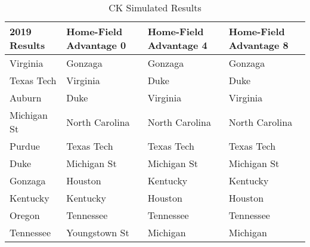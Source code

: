 \begin {table}\caption{CK Simulated Results}\begin{tabular}{ |p{2cm}|p{2cm}|p{2cm}|p{2cm}|  }
\hline
 2019 Results &  Home-Field Advantage 0 & Home-Field Advantage 4& Home-Field Advantage 8\\
\hline
Virginia & Gonzaga & Gonzaga & Gonzaga\\
\hline
Texas Tech & Virginia & Duke & Duke\\
\hline
Auburn & Duke & Virginia & Virginia\\
\hline
Michigan St & North Carolina & North Carolina & North Carolina\\
\hline
Purdue & Texas Tech & Texas Tech & Texas Tech\\
\hline
Duke & Michigan St & Michigan St & Michigan St\\
\hline
Gonzaga & Houston & Kentucky & Kentucky\\
\hline
Kentucky & Kentucky & Houston & Houston\\
\hline
Oregon & Tennessee & Tennessee & Tennessee\\
\hline
Tennessee & Youngstown St & Michigan & Michigan\\
\hline
\end{tabular}
\end{table}
